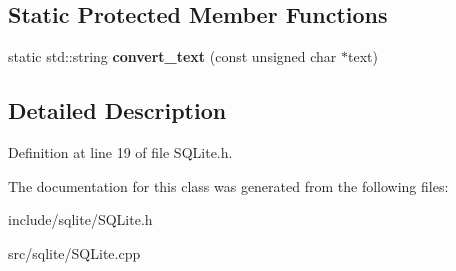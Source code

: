 \subsection*{Static Protected Member Functions}
\begin{DoxyCompactItemize}
\item 
\mbox{\label{class_s_q_lite_wrapper_a46a46fe7c7b6887967540721368acd7c}} 
static std\+::string {\bfseries convert\+\_\+text} (const unsigned char $\ast$text)
\end{DoxyCompactItemize}


\subsection{Detailed Description}


Definition at line 19 of file S\+Q\+Lite.\+h.



The documentation for this class was generated from the following files\+:\begin{DoxyCompactItemize}
\item 
include/sqlite/S\+Q\+Lite.\+h\item 
src/sqlite/S\+Q\+Lite.\+cpp\end{DoxyCompactItemize}
